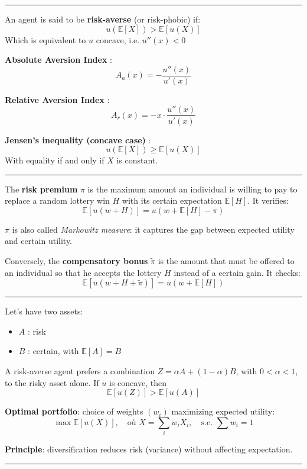 \hrule

\begin{f}
	An agent is said to be \textbf{risk-averse} (or risk-phobic) if:
	\[
	u(\mathbb{E}[X]) > \mathbb{E}[u(X)]
	\]
	Which is equivalent to \(u\) concave, i.e. \(u''(x) < 0\)
\end{f}

\begin{f}
	\textbf{Absolute Aversion Index} :
	\[
	A_a(x) = -\frac{u''(x)}{u'(x)}
	\]
	
	\textbf{Relative Aversion Index} :
	\[
	A_r(x) = -x \cdot \frac{u''(x)}{u'(x)}
	\]
	
	\textbf{Jensen's inequality (concave case)} :
	\[
	u(\mathbb{E}[X]) \geq \mathbb{E}[u(X)]
	\]
With equality if and only if \(X\) is constant.
\end{f}
\hrule


\begin{f}
	
The \textbf{risk premium} \(\pi\) is the maximum amount an individual is willing to pay to replace a random lottery win \(H\) with its certain expectation \(\mathbb{E}[H]\). It verifies:
\[
\mathbb{E}[u(w + H)] = u(w + \mathbb{E}[H] - \pi)
\]


\(\pi\) is also called \emph{Markowitz measure}: it captures the gap between expected utility and certain utility.

Conversely, the \textbf{compensatory bonus} \(\tilde{\pi}\) is the amount that must be offered to an individual so that he accepts the lottery \(H\) instead of a certain gain. It checks:
\[
\mathbb{E}[u(w + H + \tilde{\pi})] = u(w + \mathbb{E}[H])
\]

\end{f}
\hrule
\begin{f}
	
	Let's have two assets:
	\begin{itemize}
		\item \(A\) : risk
		\item \(B\) : certain, with \(\mathbb{E}[A] = B\)
	\end{itemize}
	
	A risk-averse agent prefers a combination \(Z = \alpha A + (1 - \alpha) B\), with \(0 < \alpha < 1\), to the risky asset alone.
	If \(u\) is concave, then
	\[
	\mathbb{E}[u(Z)] > \mathbb{E}[u(A)]
	\]
	
	\textbf{Optimal portfolio}: choice of weights \((w_i)\) maximizing expected utility:
	\[
	\max \mathbb{E}[u(X)], \quad \text{où } X = \sum_{i} w_i X_i, \quad \text{s.c. } \sum w_i = 1
	\]
	
	\textbf{Principle}: diversification reduces risk (variance) without affecting expectation.
	
	
\end{f}
\hrule

